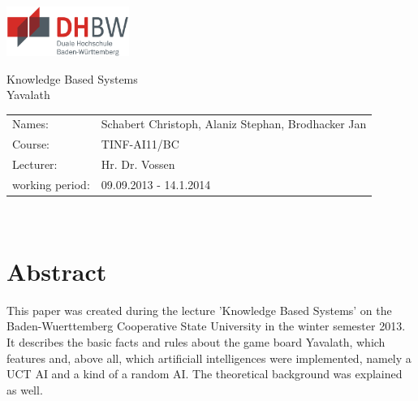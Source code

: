 \documentclass[english]{report}
\begin{document}
\pagestyle{fancy}
\lhead{}%

\lfoot{}%
\rfoot{\thepage}
\fancyhfoffset{\marginparsep}
\renewcommand{\footrulewidth}{1.0pt}
\renewcommand{\headrulewidth}{1.0pt}
\renewcommand{\headheight}{30pt}





\begin{titlepage}

\begin{flushright}
    \includegraphics*[width=4.0cm]{abbildungen/dhbwlogo} \\ 
\end{flushright}
\begin{center}
\vspace{1.5cm}
\Huge{ \textsf{Knowledge Based Systems}} \\
	Yavalath\\
    \vspace{4cm}
 \normalsize{
    \begin{tabular}{ll}
    	Names: & {Schabert Christoph,  Alaniz Stephan,  Brodhacker Jan} \\
    	Course: & {TINF-AI11/BC}	\\
    	Lecturer: &  {Hr. Dr. Vossen}\\
    	working period: & {09.09.2013 - 14.1.2014}
    \end{tabular}\\
    }
\end{center}

\end{titlepage}

\newpage 
\section*{Abstract}\thispagestyle{empty}
This paper was created during the lecture 'Knowledge Based Systems' on the
Baden-Wuerttemberg Cooperative State University in the winter semester 2013. It
describes the basic facts and rules about the game board Yavalath, which
features and, above all, which artificiall intelligences were implemented, namely
a UCT AI and a kind of a random AI. The theoretical background was explained as
well.
\end{document}
